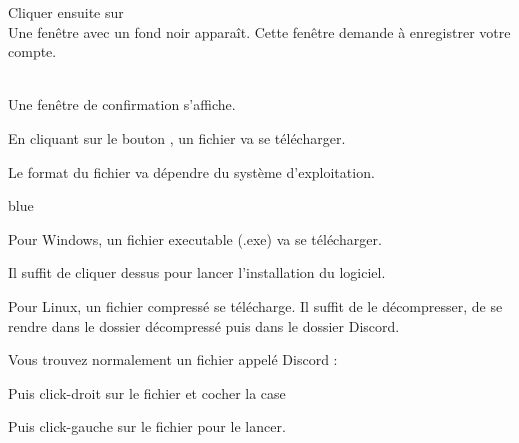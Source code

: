 
Cliquer ensuite sur  \\


Une fenêtre avec un fond noir apparaît. Cette fenêtre demande à enregistrer votre compte. \\





 \\

Une fenêtre de confirmation s'affiche. \\




En cliquant sur le bouton , un fichier va se télécharger.

Le format du fichier va dépendre du système d’exploitation.

\begin{items}{blue}{\Triangle}
	\item Pour Windows, un fichier executable (.exe) va se télécharger. 


	Il suffit de cliquer dessus pour lancer l'installation du logiciel.

	\item Pour Linux, un fichier compressé se télécharge. Il suffit de le décompresser, de se rendre dans le dossier décompressé puis dans le dossier Discord. \\


	Vous trouvez normalement un fichier appelé Discord :


	Puis click-droit sur le fichier   et cocher la case 


	Puis click-gauche sur le fichier  pour le lancer.
\end{items}

